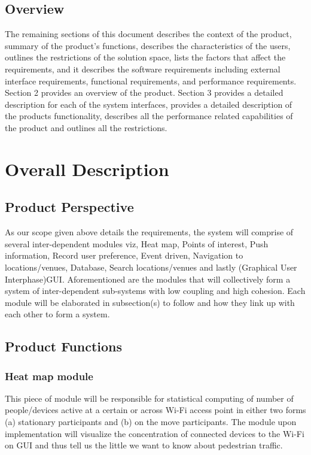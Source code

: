 \documentclass[11pt]{article}
\begin{document}
	\subsection{Overview}
	The remaining sections of this document describes the context of the product, summary of the product’s functions, describes the characteristics of the users, outlines the restrictions of the solution space, lists the factors that affect the requirements, and it describes the software requirements including external interface requirements, functional requirements,  and performance requirements. Section 2 provides an overview of the product. Section 3 provides a detailed description for each of the system interfaces, provides a detailed description of the products functionality, describes all the performance related capabilities of the product and outlines all the restrictions. 

	\section{Overall Description}
	
		\subsection{Product Perspective}
		As our scope given above details the requirements, the system will comprise of several inter-dependent modules viz, Heat map, Points of interest, Push information, Record user preference, Event driven, Navigation to locations/venues, Database, Search locations/venues and lastly (Graphical User Interphase)GUI. Aforementioned are the modules that will collectively form a system of inter-dependent sub-systems with low coupling and high cohesion. Each module will be elaborated in subsection(s) to follow and how they link up with each other to form a system. 
  	
		\subsection{Product Functions}
			\subsubsection{Heat map module}
			This piece of module will be responsible for statistical computing of number of people/devices active at a certain or across Wi-Fi access point in either two forms (a) stationary participants and (b) on the move participants. The module upon implementation will visualize the concentration of connected devices to the Wi-Fi on GUI and thus tell us the little we want to know about pedestrian traffic.
\end{document}
